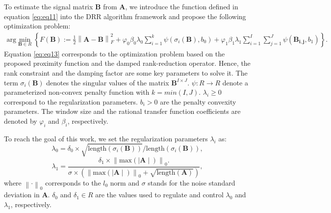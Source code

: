 To estimate the signal matrix $\mathbf{B}$ from $\mathbf{A}$, we introduce the function defined in equation \ref{eq:eq11} into the DRR algorithm framework and propose the following optimization problem:
\begin{align}
\textrm{arg}\min_{\mathbf{B} \in R}\left\lbrace F(\mathbf{B}):=\frac{1}{2}
\left\|\mathbf{A} - \mathbf{B}\right\|_F^2 + \varphi_0\beta_0\lambda_0
\sum_{i=1}^{k}\psi\left(\sigma_i\left( \mathbf{B}\right),{b_0} \right) + \varphi_1\beta_1\lambda_1\sum_{i=1}^{I}\sum_{j=1}^{J}\psi\left(\mathbf{B_{i,j}},{b_1} \right)\right\rbrace.
\label{eq:eq13}
\end{align}	
Equation \ref{eq:eq13} corresponds to the optimization problem based on the proposed proximity function and the damped rank-reduction operator. Hence, the rank constraint and the damping factor are some key parameters to solve it. The term $\sigma_i\left(\mathbf{B}\right)$ denotes the singular values of the matrix $\mathbf{B}^{I \times J} $. $\psi : R \rightarrow R$ denote a parameterized non-convex penalty function with $k = min \left( I, J\right) $. $\lambda_i \geq 0$ correspond to the regularization parameters. ${b_i} > 0$ are the penalty convexity parameters. The window size and the rational transfer function coefficients are denoted by $\varphi_i$ and $\beta_i$, respectively.


To reach the goal of this work, we set the regularization parameters $\lambda_i$ as:   
\begin{equation}
\lambda_0 = \delta_0\times\sqrt{\textrm{length}(\sigma_i\left( \mathbf{B}\right))}\slash{\textrm{length}(\sigma_i\left(\mathbf{B}\right))},
\label{eq:eq14}
\end{equation}
\begin{equation}
\lambda_1=\frac{\delta_1\times \left\| \textrm{max}\left(\mid \mathbf{A} \mid \right) \right\|_0 .}{\sigma \times \left(\left\| \textrm{max}\left(\mid \mathbf{A} \mid \right) \right\|_0 + \sqrt{\textrm{length}(\mathbf{A})} \right)},
\label{eq:eq15}
\end{equation}
where $\left\|\cdot\right\|_0$ corresponds to the $l_0$ norm and $\sigma$ stands for the noise standard deviation in $\mathbf{A}$. $\delta_0$ and $\delta_1 \in R$ are the values used to regulate and control $\lambda_0$ and $\lambda_1$, respectively.  

